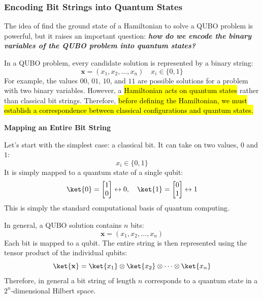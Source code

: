 \subsubsection{Encoding Bit Strings into Quantum States}\label{sec:encoding-bit-strings-into-quantum-states}

\textcolor{Red2}{} The idea of find the ground state of a Hamiltonian to solve a QUBO problem is powerful, but it raises an important question: \textbf{\emph{how do we encode the binary variables of the QUBO problem into quantum states?}}

\highspace
In a QUBO problem, every candidate solution is represented by a binary string:
\begin{equation*}
    \mathbf{x} = \left(x_{1}, x_{2}, \dots, x_{n}\right) \quad x_{i} \in \{0, 1\}
\end{equation*}
For example, the values $00$, $01$, $10$, and $11$ are possible solutions for a problem with two binary variables. However, a \hl{Hamiltonian acts on quantum states} rather than classical bit strings. Therefore, \hl{before defining the Hamiltonian, we must establish a correspondence between classical configurations and quantum states.}

\highspace
\begin{flushleft}
    \textcolor{Green3}{ \textbf{Mapping an Entire Bit String}}
\end{flushleft}
Let's start with the simplest case: a classical bit. It can take on two values, $0$ and $1$:
\begin{equation*}
    x_{i} \in \{0, 1\}
\end{equation*}
It is simply mapped to a quantum state of a single qubit:
\begin{equation*}
    \ket{0} = \begin{bmatrix}
        1 \\
        0
    \end{bmatrix} \leftrightarrow 0, \quad \ket{1} = \begin{bmatrix}
        0 \\
        1
    \end{bmatrix} \leftrightarrow 1
\end{equation*}
This is simply the standard computational basis of quantum computing.

\highspace
In general, a QUBO solution contains $n$ bits:
\begin{equation*}
    \mathbf{x} = \left(x_1, x_2, \dots, x_n\right)
\end{equation*}
Each bit is mapped to a qubit. The entire string is then represented using the tensor product of the individual qubits:
\begin{equation*}
    \ket{\mathbf{x}} = \ket{x_1} \otimes \ket{x_2} \otimes \cdots \otimes \ket{x_n}
\end{equation*}
Therefore, in general a bit string of length $n$ corresponds to a quantum state in a $2^n$-dimensional Hilbert space.

